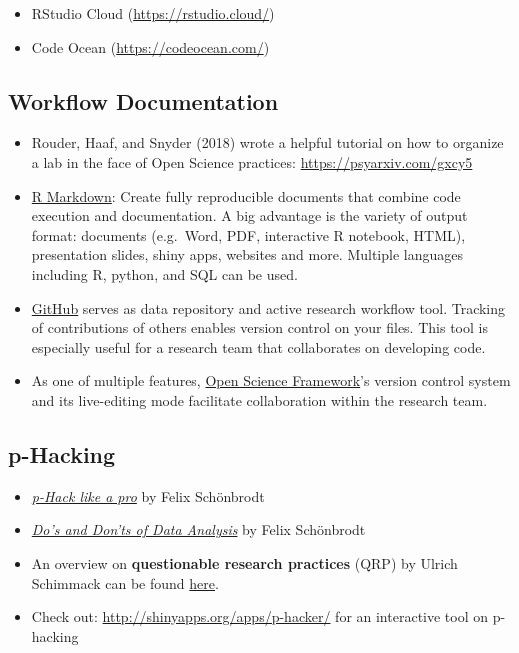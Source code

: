 \documentclass[12pt,]{report}
\providecommand{\tightlist}{%
  \setlength{\itemsep}{0pt}\setlength{\parskip}{0pt}}
\begin{document}
\begin{itemize}
\tightlist
\item
  RStudio Cloud (\url{https://rstudio.cloud/})
\item
  Code Ocean (\url{https://codeocean.com/})
\end{itemize}

\subsection{Workflow Documentation}\label{workflow-documentation}

\begin{itemize}
\tightlist
\item
  Rouder, Haaf, and Snyder (2018) wrote a helpful tutorial on how to
  organize a lab in the face of Open Science practices:
  \url{https://psyarxiv.com/gxcy5}
\item
  \href{https://rmarkdown.rstudio.com/}{R Markdown}: Create fully
  reproducible documents that combine code execution and documentation.
  A big advantage is the variety of output format: documents (e.g.~Word,
  PDF, interactive R notebook, HTML), presentation slides, shiny apps,
  websites and more. Multiple languages including R, python, and SQL can
  be used.
\item
  \href{https://github.com}{GitHub} serves as data repository and active
  research workflow tool. Tracking of contributions of others enables
  version control on your files. This tool is especially useful for a
  research team that collaborates on developing code.
\item
  As one of multiple features, \href{https://osf.io}{Open Science
  Framework}'s version control system and its live-editing mode
  facilitate collaboration within the research team.
\end{itemize}

\subsection{p-Hacking}\label{p-hacking}

\begin{itemize}
\tightlist
\item
  \emph{\href{https://osf.io/u4jgz/}{p-Hack like a pro}} by Felix
  Schönbrodt
\item
  \href{https://osf.io/9fx5q/}{\emph{Do's and Don'ts of Data Analysis}}
  by Felix Schönbrodt
\item
  An overview on \textbf{questionable research practices} (QRP) by
  Ulrich Schimmack can be found
  \href{https://replicationindex.wordpress.com/2015/01/24/questionable-research-practices-definition-detect-and-recommendations-for-better-practices/}{here}.
\item
  Check out: \url{http://shinyapps.org/apps/p-hacker/} for an
  interactive tool on
  p-hacking\href{http://shinyapps.org/apps/p-hacker/}{}
\end{itemize}
\end{document}

